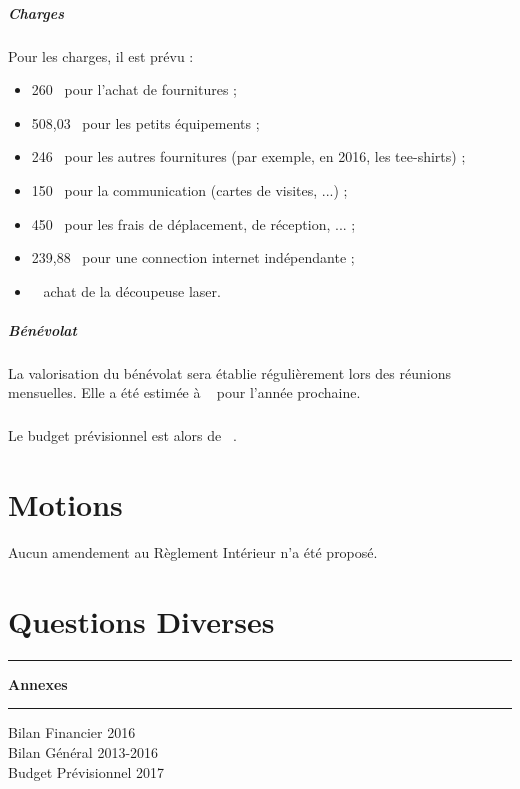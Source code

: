 \documentclass[11pt]{article}
\begin{document}
\subparagraph{Charges}
Pour les charges, il est prévu :
\begin{itemize}
 \item 260~\officialeuro{} pour l'achat de fournitures ;
 \item 508,03~\officialeuro{} pour les petits équipements ;
 \item 246~\officialeuro{} pour les autres fournitures (par exemple, en 2016, les tee-shirts) ;
 \item 150~\officialeuro{} pour la communication (cartes de visites, ...) ;
 \item 450~\officialeuro{} pour les frais de déplacement, de réception, ... ;
 \item 239,88~\officialeuro{} pour une connection internet indépendante ;
 \item {}~\officialeuro{} achat de la découpeuse laser.
\end{itemize}

\subparagraph{Bénévolat}La valorisation du bénévolat sera établie régulièrement lors des réunions mensuelles.
Elle a été estimée à ~\officialeuro{} pour l'année prochaine.

\subparagraph{}Le budget prévisionnel est alors de ~\officialeuro{}.

\section{Motions}
Aucun amendement au Règlement Intérieur n'a été proposé.

\section{Questions Diverses}

\newpage

\clearpage
\thispagestyle{empty}
\vspace*{\fill}
\begin{center}
\hrule
\vspace{.3cm}
\Huge\bfseries Annexes
\vspace{.3cm}
\hrule
\vspace{2cm}
\Large
\noindent Bilan Financier 2016\\
Bilan Général 2013-2016\\
Budget Prévisionnel 2017
\end{center}
\vspace*{\fill}




\end{document}
